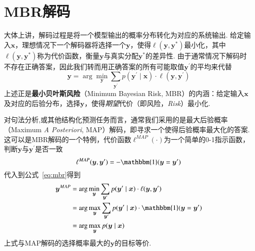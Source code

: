 \section{MBR解码}\label{sec:mbr-decoding}
大体上讲，解码过程是将一个模型输出的概率分布转化为对应的系统输出.
给定输入$\boldsymbol{x}$，理想情况下一个解码器将选择一个$\boldsymbol{y}$，使得$\ell(\boldsymbol{y},\boldsymbol{y}^{\ast})$最小化，其中$\ell(\boldsymbol{y},\boldsymbol{y}^{\ast})$称为代价函数，衡量$\boldsymbol{y}$与真实分配$\boldsymbol{y}^{\ast}$的差异性.
由于通常情况下解码时不存在正确答案，因此我们转而用正确答案的所有可能取值$\boldsymbol{y}^{\prime}$的平均来代替
\begin{equation}
    \label{eq:mbr}
    \boldsymbol{y}= \arg\min_{\boldsymbol{y}}\sum_{\boldsymbol{y}^{\prime}}p(\boldsymbol{y}^{\prime}\mid\boldsymbol{x})\cdot\ell(\boldsymbol{y},\boldsymbol{y}^{\prime})
\end{equation}
上述正是\textbf{最小贝叶斯风险}（Minimum Bayesian Risk, MBR）的内涵：给定输入$\boldsymbol{x}$及对应的后验分布，选择$\boldsymbol{y}$，使得\textit{期望}代价（即风险，\textit{Risk}）最小化\cite{stoyanov-eisner-2012-minimum}.

对句法分析,或其他结构化预测任务而言，通常我们采用的是最大后验概率（Maximum \textit{A Posteriori}, MAP）解码，即寻求一个使得后验概率最大化的答案.
这可以是MBR解码的一个特例，代价函数$\ell^{MAP}(\cdot)$为一个简单的0-1指示函数，判断$\boldsymbol{y}$与$\boldsymbol{y}^{\prime}$是否一致
\begin{equation}
    \ell^{MAP}(\boldsymbol{y},\boldsymbol{y}^{\prime}) = -\mathbbm{1}(\boldsymbol{y}=\boldsymbol{y}^{\prime})
\end{equation}
代入到公式~\ref{eq:mbr}得到
\begin{equation}
    \label{eq:map}
    \begin{split}
        \boldsymbol{y}^{MAP}&= \arg\min_{\boldsymbol{y}}\sum_{\boldsymbol{y}^{\prime}}p(\boldsymbol{y}^{\prime}\mid\boldsymbol{x})\cdot\ell(\boldsymbol{y},\boldsymbol{y}^{\prime})\\
        &=\arg\max_{\boldsymbol{y}}\sum_{\boldsymbol{y}^{\prime}}p(\boldsymbol{y}^{\prime}\mid\boldsymbol{x})\cdot\mathbbm{1}(\boldsymbol{y}=\boldsymbol{y}^{\prime})\\
        &=\arg\max_{\boldsymbol{y}}p(\boldsymbol{y}\mid\boldsymbol{x})
    \end{split}
\end{equation}
上式与MAP解码的选择概率最大的$\boldsymbol{y}$的目标等价.

